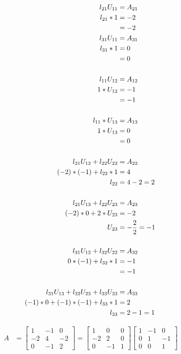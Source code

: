 	\begin{align}
		l_{21}U_{11} &= A_{21}& \notag \\
		l_{21}*1 &= -2& \notag \\
		&= -2& \\
		l_{31}U_{11} &= A_{31}& \notag \\
		l_{31}*1 &= 0& \notag \\
		&= 0& \\
		\notag \\		
		l_{11}U_{12} &= A_{12}& \notag \\
		1*U_{12} &= -1& \notag \\
		&= -1& \\
		\notag \\
		l_{11}*U_{13} &= A_{13}& \notag \\
		1*U_{13} &= 0& \notag \\
		&= 0& \\
		\notag \\
		l_{21}U_{12} + l_{22}U_{22} &= A_{22}& \notag \\
		(-2)*(-1) + l_{22}*1 &= 4& \notag \\
		l_{22} &= 4 - 2 = 2& \\
		\notag \\
		l_{21}U_{13} + l_{22}U_{23} &= A_{23}& \notag \\
		(-2)*0 + 2*U_{23} &= -2& \notag \\
		U_{23} &= -\frac{2}{2} = -1 \\
		\notag \\
		l_{31}U_{12} + l_{32}U_{22} &= A_{32}& \notag \\
		0*(-1) + l_{32}*1 &= -1& \notag \\
		&= -1& \\
		\notag \\
		l_{31}U_{13} + l_{32}U_{23} + l_{33}U_{33} &= A_{33}& \notag \\
		(-1)*0 + (-1)*(-1) + l_{33}*1 &= 2& \notag \\
		l_{33} &= 2 - 1 = 1&
	\label{eq:52terms}
	\end{align}

	\begin{align}
		A &= \begin{bmatrix}
				1 & -1 & 0 \\[0.3em]
				-2 & 4 & -2 \\[0.3em]
				0 & -1 & 2
			\end{bmatrix}
			=
			\begin{bmatrix}
				1 & 0 & 0 \\[0.3em]
				-2 & 2 & 0 \\[0.3em]
				0 & -1 & 1
			\end{bmatrix}
			\begin{bmatrix}
				1 & -1 & 0 \\[0.3em]
				0 & 1 & -1 \\[0.3em]
				0 & 0 & 1
			\end{bmatrix}&
	\label{eq:52crout}
	\end{align}

